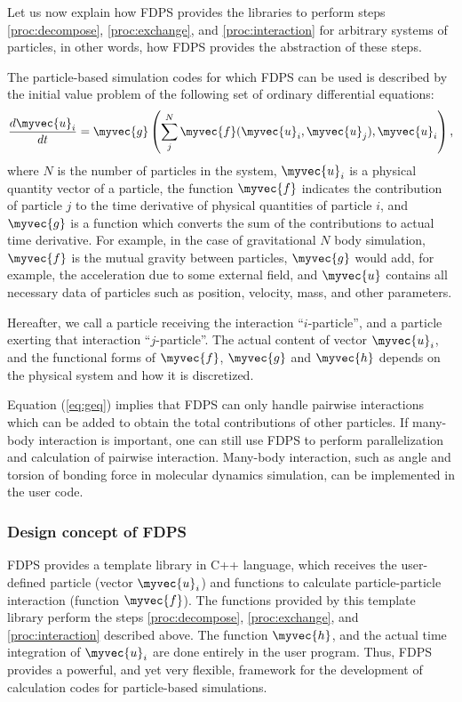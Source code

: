 Let us now explain how FDPS provides the libraries to perform steps
\ref{proc:decompose}, \ref{proc:exchange}, and
\ref{proc:interaction} for arbitrary systems of particles, in other
words, how FDPS provides the abstraction of these steps. 

The particle-based simulation codes for which FDPS can be used is
described by the initial value problem of the following set of 
ordinary differential equations:
\begin{align}
  \frac{d\myvec{u}_i}{dt} = \myvec{g}\left(\sum_j^N \myvec{f}
  (\myvec{u}_i, \myvec{u}_j), \myvec{u}_i\right), \label{eq:geq}
\end{align}
where $N$ is the number of  particles in the system,
$\myvec{u}_i$ is a physical quantity vector of a particle, the
function $\myvec{f}$ indicates the contribution of particle $j$ to the
time derivative of physical quantities of particle $i$, 
and $\myvec{g}$ is a function which converts the sum of the
contributions  to actual
time derivative. For example, in the case of gravitational $N$ body
simulation, $\myvec{f}$ is the mutual gravity between particles,
$\myvec{g}$ would add, for example, the acceleration due to some
external field, and $\myvec{u}$ contains all necessary data of
particles such as position, velocity, mass, and other parameters. 

Hereafter, we call a particle receiving the interaction
``$i$-particle'', and a particle exerting that interaction
``$j$-particle''. The actual content of
vector $\myvec{u}_i$, and the functional forms of  $\myvec{f}$,
$\myvec{g}$  and  $\myvec{h}$ depends on the physical system
and how it is discretized. 

Equation (\ref{eq:geq}) implies that FDPS can only handle pairwise
interactions which can be added to obtain the total contributions of
other particles. If many-body interaction is important, one can still
use FDPS to perform parallelization and calculation of pairwise
interaction. Many-body interaction, such as angle and torsion of
bonding force in molecular dynamics simulation, can be implemented in
the user code. 

\subsubsection{Design concept of FDPS}
\label{sec:concept}

FDPS provides a template library in C++ language,
which receives the  user-defined particle 
(vector $\myvec{u}_i$) and functions to calculate particle-particle interaction  (function
$\myvec{f}$). The functions provided by this template library perform
the steps \ref{proc:decompose}, \ref{proc:exchange}, and
\ref{proc:interaction} described above. The function  
$\myvec{h}$, and the actual time integration of 
$\myvec{u}_i$ are done entirely in the user program. Thus, FDPS
provides a powerful, and yet very flexible, framework for the
development of calculation codes for particle-based simulations.


